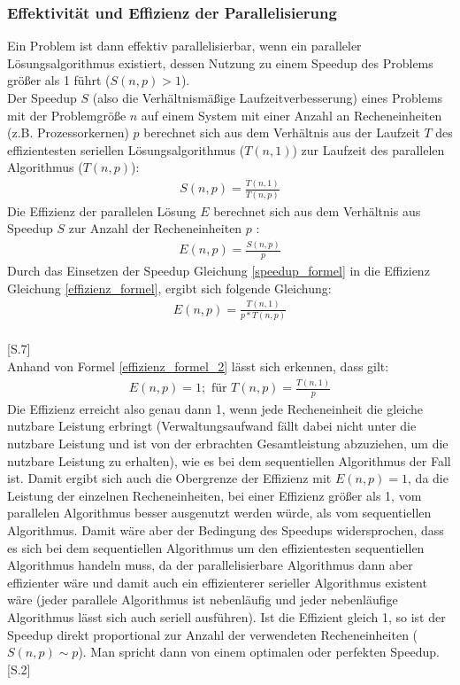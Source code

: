 \subsubsection{Effektivität und Effizienz der Parallelisierung}
Ein Problem ist dann effektiv parallelisierbar, wenn ein paralleler Lösungsalgorithmus existiert, dessen Nutzung zu einem Speedup des Problems größer als 1 führt \mbox{($S(n,p)>1$)}.\\
Der Speedup $S$ (also die Verhältnismäßige Laufzeitverbesserung) eines Problems mit der Problemgröße $n$ auf einem System mit einer Anzahl an Recheneinheiten (z.B. Prozessorkernen) $p$ berechnet sich aus dem Verhältnis aus der Laufzeit $T$ des effizientesten seriellen Lösungsalgorithmus \mbox{($T(n,1)$)} zur Laufzeit des parallelen Algorithmus \mbox{($T(n,p)$)}:
\begin{align}
S(n,p)=\frac{T(n,1)}{T(n,p)}
\label{speedup_formel}
\end{align}
Die Effizienz der parallelen Lösung $E$ berechnet sich aus dem Verhältnis aus Speedup $S$ zur Anzahl der Recheneinheiten $p$ :
\begin{align}
E(n,p)=\frac{S(n,p)}{p}
\label{effizienz_formel}
\end{align}
Durch das Einsetzen der Speedup Gleichung \ref{speedup_formel} in die Effizienz Gleichung \ref{effizienz_formel}, ergibt sich folgende Gleichung:
\begin{align}
E(n,p)=\frac{T(n,1)}{p*T(n,p)}
\label{effizienz_formel_2}
\end{align}\\
\cite{Tichy_Parallele_Algorithmen}[S.7]\\[0.25 cm]
Anhand von Formel \ref{effizienz_formel_2} lässt sich erkennen, dass gilt:
\begin{align}
E(n,p)=1;\text{ für }T(n,p)=\frac{T(n,1)}{p}
\end{align}
Die Effizienz erreicht also genau dann 1, wenn jede Recheneinheit die gleiche nutzbare Leistung erbringt (Verwaltungsaufwand fällt dabei nicht unter die nutzbare Leistung und ist von der erbrachten Gesamtleistung abzuziehen, um die nutzbare Leistung zu erhalten), wie es bei dem sequentiellen Algorithmus der Fall ist. Damit ergibt sich auch die Obergrenze der Effizienz mit $E(n,p)=1$, da die Leistung der einzelnen Recheneinheiten, bei einer Effizienz größer als 1, vom parallelen Algorithmus besser ausgenutzt werden würde, als vom sequentiellen Algorithmus. Damit wäre aber der Bedingung des Speedups widersprochen, dass es sich bei dem sequentiellen Algorithmus um den effizientesten sequentiellen Algorithmus handeln muss, da der parallelisierbare Algorithmus dann aber effizienter wäre und damit auch ein effizienterer serieller Algorithmus existent wäre (jeder parallele Algorithmus ist nebenläufig und jeder nebenläufige Algorithmus lässt sich auch seriell ausführen). Ist die Effizient gleich 1, so ist der Speedup direkt proportional zur Anzahl der verwendeten Recheneinheiten \mbox{($S(n,p)\sim p$)}. Man spricht dann von einem optimalen oder perfekten Speedup. \cite{Rogina_Parallele_Algorithmen}[S.2]\\
